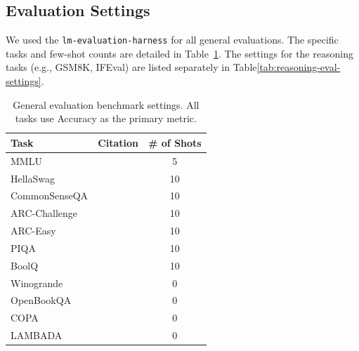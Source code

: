 
\subsection{Evaluation Settings}
\label{sec:appendix_eval_settings}

We used the \texttt{lm-evaluation-harness} \citep{eval-harness} for all general evaluations. The specific tasks and few-shot counts are detailed in Table~\ref{tab:eval_settings_general}. The settings for the reasoning tasks (e.g., GSM8K, IFEval) are listed separately in Table\ref{tab:reasoning-eval-settings}.

\begin{table}[ht]
\centering
\caption{General evaluation benchmark settings. All tasks use Accuracy as the primary metric.}
\label{tab:eval_settings_general}
\begin{tabular}{@{}llc@{}}
\toprule
Task & Citation & \# of Shots \\
\midrule
MMLU & \cite{hendrycks2021mmlu} & 5 \\
HellaSwag & \cite{zellers2019hellaswag} & 10 \\
CommonSenseQA & \cite{talmor2019commonsenseqa} & 10 \\
ARC-Challenge & \cite{clark2018arc} & 10 \\
ARC-Easy & \cite{clark2018arc} & 10 \\
PIQA & \cite{bisk2019piqareasoningphysicalcommonsense} & 10 \\
BoolQ & \cite{clark2019boolq} & 10 \\
Winogrande & \cite{sakaguchi2020winogrande} & 0 \\
OpenBookQA & \cite{mihaylov2018openbookqa} & 0 \\
COPA & \cite{copa} & 0 \\
LAMBADA & \cite{paperno2016lambada} & 0 \\
\bottomrule
\end{tabular}
\end{table}

